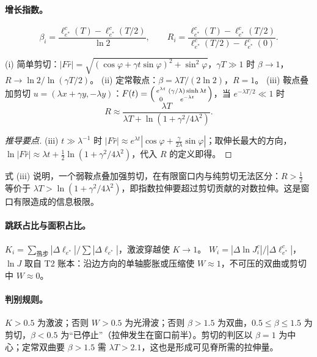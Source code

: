 \paragraph{增长指数。}
\begin{equation}
\beta_i=\frac{\ell^c_{e^\ast}(T)-\ell^c_{e^\ast}(T/2)}{\ln2},\qquad R_i=\frac{\ell^c_{e^\ast}(T)-\ell^c_{e^\ast}(T/2)}{\ell^c_{e^\ast}(T/2)-\ell^c_{e^\ast}(0)}.
\end{equation}

\begin{proposition}[解析值]
(i) 简单剪切：$|F\hat r|=\sqrt{(\cos\varphi+\gamma t\sin\varphi)^2+\sin^2\varphi}$，$\gamma T\gg1$ 时 $\beta\to1$，$R\to\ln2/\ln(\gamma T/2)$。
(ii) 定常鞍点：$\beta=\lambda T/(2\ln2)$，$R=1$。
(iii) 鞍点叠加剪切 $u=(\lambda x+\gamma y,-\lambda y)$：$F(t)=\begin{psmallmatrix}e^{\lambda t}&(\gamma/\lambda)\sinh\lambda t\\0&e^{-\lambda t}\end{psmallmatrix}$，当 $e^{-\lambda T/2}\ll1$ 时
\begin{equation}
R\approx\frac{\lambda T}{\lambda T+\ln(1+\gamma^2/4\lambda^2)} .
\end{equation}
\end{proposition}
\begin{proof}[推导要点]
(iii) $t\gg\lambda^{-1}$ 时 $|F\hat r|\approx e^{\lambda t}|\cos\varphi+\tfrac{\gamma}{2\lambda}\sin\varphi|$；取伸长最大的方向，$\ln|F\hat r|\approx\lambda t+\tfrac12\ln(1+\gamma^2/4\lambda^2)$，代入 $R$ 的定义即得。
\end{proof}

式 (iii) 说明，一个弱鞍点叠加强剪切，在有限窗口内与纯剪切无法区分：$R>\tfrac12$ 等价于 $\lambda T>\ln(1+\gamma^2/4\lambda^2)$，即指数拉伸要超过剪切贡献的对数拉伸。这是窗口有限造成的信息极限。

\paragraph{跳跃占比与面积占比。}
$K_i=\sum_{\text{热步}}|\Delta\ell_{e^\ast}|/\sum|\Delta\ell_{e^\ast}|$，激波穿越使 $K\to1$。
$W_i=|\Delta\ln J^c_i|/|\Delta\ell^c_{e^\ast}|$，$\ln J$ 取自 T2 账本：沿边方向的单轴膨胀或压缩使 $W\approx1$，不可压的双曲或剪切中 $W\approx0$。

\paragraph{判别规则。}$K>0.5$ 为激波；否则 $W>0.5$ 为光滑波；否则 $\beta>1.5$ 为双曲，$0.5\le\beta\le1.5$ 为剪切，$\beta<0.5$ 为“已停止”（拉伸发生在窗口前半）。剪切的判区以 $\beta=1$ 为中心；定常双曲要 $\beta>1.5$ 需 $\lambda T>2.1$，这也是形成可见脊所需的拉伸量。

